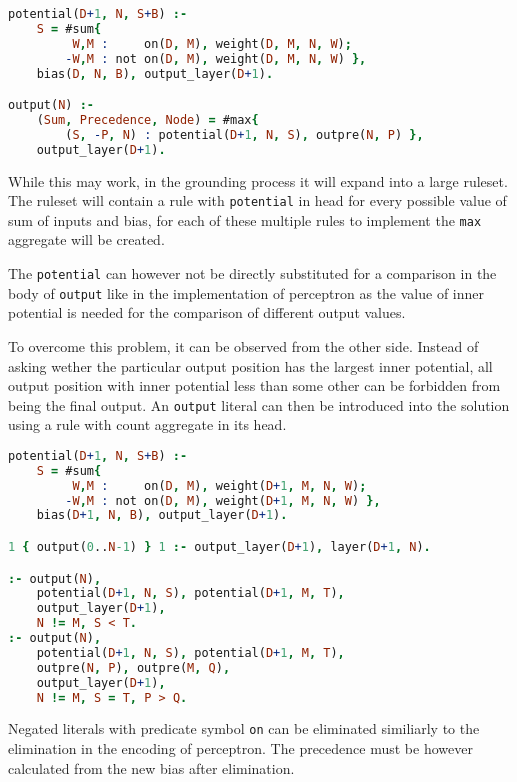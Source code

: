 \begin{lstlisting}[language=Prolog, numbers=none]
potential(D+1, N, S+B) :-
    S = #sum{
         W,M :     on(D, M), weight(D, M, N, W);
        -W,M : not on(D, M), weight(D, M, N, W) },
    bias(D, N, B), output_layer(D+1).

output(N) :-
    (Sum, Precedence, Node) = #max{
        (S, -P, N) : potential(D+1, N, S), outpre(N, P) },
    output_layer(D+1).
\end{lstlisting}

While this may work, in the grounding process it will expand into a large ruleset.
The ruleset will contain a rule with \texttt{potential} in head for every
possible value of sum of inputs and bias, for each of these multiple rules
to implement the \texttt{max} aggregate will be created.

The \texttt{potential} can however not be directly substituted for a comparison
in the body of \texttt{output} like in the implementation of perceptron
as the value of inner potential is needed for the comparison of different output values.

To overcome this problem, it can be observed from the other side.
Instead of asking wether the particular output position has the largest inner potential,
all output position with inner potential less than some other can be forbidden from being
the final output. An \texttt{output} literal can then be introduced into the solution
using a rule with count aggregate in its head.

\begin{lstlisting}[language=Prolog, numbers=none]
potential(D+1, N, S+B) :-
    S = #sum{
         W,M :     on(D, M), weight(D+1, M, N, W);
        -W,M : not on(D, M), weight(D+1, M, N, W) },
    bias(D+1, N, B), output_layer(D+1).

1 { output(0..N-1) } 1 :- output_layer(D+1), layer(D+1, N).

:- output(N),
    potential(D+1, N, S), potential(D+1, M, T),
    output_layer(D+1),
    N != M, S < T.
:- output(N),
    potential(D+1, N, S), potential(D+1, M, T),
    outpre(N, P), outpre(M, Q),
    output_layer(D+1),
    N != M, S = T, P > Q.
\end{lstlisting}

Negated literals with predicate symbol \texttt{on} can be eliminated similiarly
to the elimination in the encoding of perceptron. The precedence must be however
calculated from the new bias after elimination.%
\label{sec:01-argmax}

